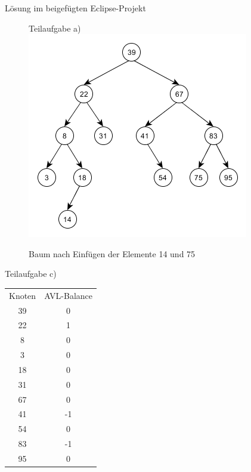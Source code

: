 \documentclass[12pt]{scrartcl}
\begin{document}

\exercise{}
Lösung im beigefügten Eclipse-Projekt

\exercise{}

\begin{figure}[h!]
\begin{center}
Teilaufgabe a)
\includegraphics[scale=0.8]{Aufgabe2a)B2.png}
\caption{Baum nach Einfügen der Elemente 14 und 75}
\end{center}
\end{figure}

Teilaufgabe c)\\
\begin{center}
\begin{tabular}{c c}
Knoten & AVL-Balance\\
39 & 0\\
22 & 1\\
8 & 0\\
3 & 0\\
18 & 0\\
31 & 0\\
67 & 0 \\
41 & -1\\
54 & 0\\
83 & -1\\
95 & 0
\end{tabular}
\end{center}
\end{document}
